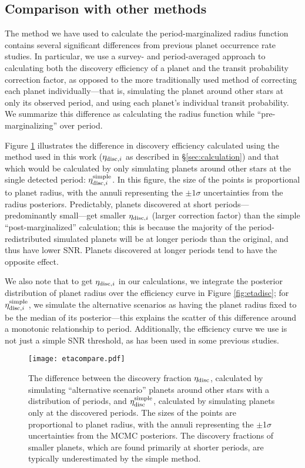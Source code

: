 \documentclass[iop]{emulateapj}
\begin{document}
\subsection{Comparison with other methods}
\label{sec:comparison}

The method we have used to calculate the period-marginalized radius function contains several significant differences from previous planet occurrence rate studies.  In particular, we use a survey- and period-averaged approach to calculating both the discovery efficiency of a planet and the transit probability correction factor, as opposed to the more traditionally used method of correcting each planet individually---that is, simulating the planet around other stars at only its observed period, and using each planet's individual transit probability.  We summarize this difference as calculating the radius function while ``pre-marginalizing'' over period.


Figure \ref{fig:etacompare} illustrates the difference in discovery efficiency calculated using the method used in this work ($\eta_{{\rm disc},i}$ as described in \S\ref{sec:calculation}) and that which would be calculated by only simulating planets around other stars at the single detected period: $\eta_{{\rm disc},i}^{\rm simple}$.  In this figure, the size of the points is proportional to planet radius, with the annuli representing the $\pm 1 \sigma$ uncertainties from the radius posteriors.  Predictably, planets discovered at short periods---predominantly small---get smaller $\eta_{{\rm disc},i}$ (larger correction factor) than the simple ``post-marginalized'' calculation; this is because the majority of the period-redistributed simulated planets will be at longer periods than the original, and thus have lower SNR.  Planets discovered at longer periods tend to have the opposite effect.  


We also note that to get $\eta_{{\rm disc},i}$ in our calculations, we integrate the posterior distribution of planet radius over the efficiency curve in Figure \ref{fig:etadisc}; for $\eta_{{\rm disc},i}^{\rm simple}$, we simulate the alternative scenarios as having the planet radius fixed to be the median of its posterior---this explains the scatter of this difference around a monotonic relationship to period.  Additionally, the efficiency curve we use is not just a simple SNR threshold, as has been used in some previous studies.


\begin{figure}[t!]
   \centering
   \texttt{[image: etacompare.pdf]} %
   \caption{The difference between the discovery fraction $\eta_{\rm disc}$, calculated by simulating ``alternative scenario'' planets around other stars with a distribution of periods, and $\eta_{\rm disc}^{\rm simple}$, calculated by simulating planets only at the discovered periods.  The sizes of the points are proportional to planet radius, with the annuli representing the $\pm$1$\sigma$ uncertainties from the MCMC posteriors.  The discovery fractions of smaller planets, which are found primarily at shorter periods, are typically underestimated by the simple method.}
   \label{fig:etacompare}
\end{figure}
\end{document}
